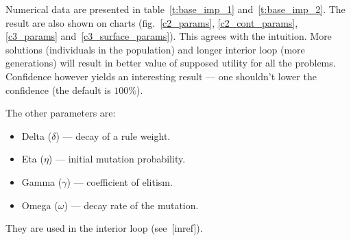 Numerical data are presented in table~\ref{t:base_imp_1}
and~\ref{t:base_imp_2}. The result are also shown on charts
(fig.~\ref{c2_params}, \ref{c2_cont_params}, \ref{c3_params}
and~\ref{c3_surface_params}). This agrees with the intuition. More solutions
(individuals in the population) and longer interior loop (more generations)
will result in better value of supposed utility for all the
problems. Confidence however yields an interesting result --- one shouldn't lower
the confidence (the default is $100\%$).

The other parameters are:
\begin{itemize}
\item Delta ($\delta$) --- decay of a rule weight.
\item Eta ($\eta$) --- initial mutation probability.
\item Gamma ($\gamma$) --- coefficient of elitism.
\item Omega ($\omega$) --- decay rate of the mutation.
\end{itemize}

They are used in the interior loop (see~[inref]).

